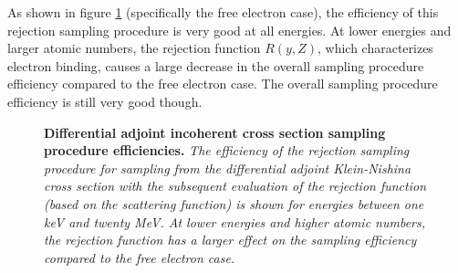 As shown in figure \ref{fig:diff_adj_incoh_sampling_proc_eff} (specifically the 
free electron case), the efficiency of this rejection sampling procedure is very
good at all energies. At lower energies and larger atomic numbers, the rejection
function $R(y,Z)$, which characterizes electron binding, causes a large decrease
in the overall sampling procedure efficiency compared to the free electron case.
The overall sampling procedure efficiency is still very good though.
\begin{figure}[t!]
  \begin{center}
  \end{center}
  \caption{\textbf{Differential adjoint incoherent cross section sampling procedure efficiencies.}
    \textit{The efficiency of the rejection sampling procedure for sampling 
      from the differential adjoint Klein-Nishina cross section with the 
      subsequent evaluation of the rejection function (based on the scattering 
      function) is shown for energies between one keV and twenty MeV. At lower 
      energies and higher atomic numbers, the rejection function has a larger 
      effect on the sampling efficiency compared to the free electron case.}}
  \label{fig:diff_adj_incoh_sampling_proc_eff}
\end{figure}

